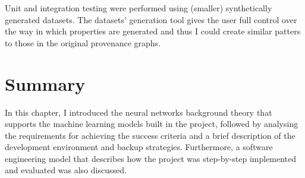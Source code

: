Unit and integration testing were performed using (smaller) synthetically generated datasets. The datasets' generation tool gives the user full control over the way in which properties are generated and thus I could create similar patters to those in the original provenance graphs. \\

\section{Summary}

In this chapter, I introduced the neural networks background theory that supports the machine learning models built in the project, followed by analysing the requirements for achieving the success criteria and a brief description of the development environment and backup strategies. Furthermore, a software engineering model that describes how the project was step-by-step implemented and evaluated was also discussed. \\

